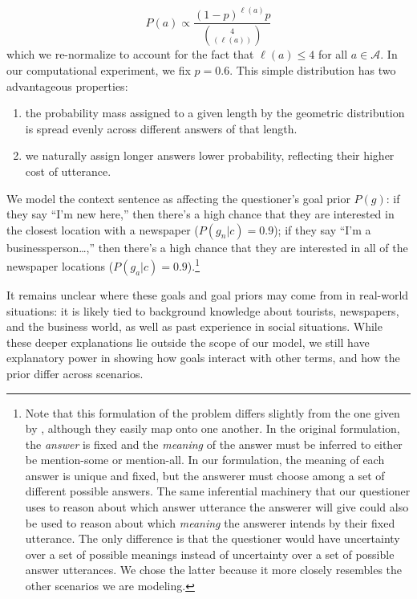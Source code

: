 \documentclass[12pt, floatsintext, jou]{apa6}
\begin{document}
$$P(a) \propto \frac{(1 - p)^{\ell(a)}p}{{4 \choose (\ell(a))}}$$
which we re-normalize to account for the fact that $\ell(a) \le 4$ for all $a\in \mathcal{A}$. In our computational experiment, we fix $p = 0.6$. 
This simple distribution has two advantageous properties: 
\begin{enumerate}[(1)]
\item the probability mass assigned to a given length by the geometric distribution is spread evenly across different answers of that length.
\item we naturally assign longer answers lower probability, reflecting their higher cost of utterance. \end{enumerate}

We model the context sentence as affecting the questioner's goal prior $P(g)$: if they say ``I'm new here,'' then there's a high chance that they are interested in the closest location with a newspaper ($P(g_n | c) = 0.9$); if they say ``I'm a businessperson\dots,'' then there's a high chance that they are interested in all of the newspaper locations ($P(g_a | c) = 0.9$).\footnote{Note that this formulation of the problem differs slightly from the one given by , although they easily map onto one another. In the original formulation, the \emph{answer} is fixed and the \emph{meaning} of the answer must be inferred to either be mention-some or mention-all. In our formulation, the meaning of each answer is unique and fixed, but the answerer must choose among a set of different possible answers. The same inferential machinery that our questioner uses to reason about which answer utterance the answerer will give could also be used to reason about which \emph{meaning} the answerer intends by their fixed utterance. The only difference is that the questioner would have uncertainty over a set of possible meanings instead of uncertainty over a set of possible answer utterances. We chose the latter because it more closely resembles the other scenarios we are modeling.}

It remains unclear where these goals and goal priors may come from in real-world situations: it is likely tied to background knowledge about tourists, newspapers, and the business world, as well as past experience in social situations. While these deeper explanations lie outside the scope of our model, we still have explanatory power in showing how goals interact with other terms, and how the prior differ across scenarios. 
\end{document}
